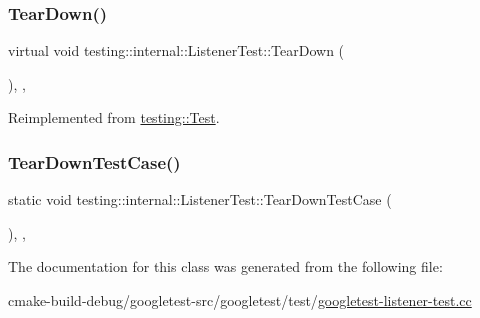 \subsubsection{\texorpdfstring{TearDown()}{TearDown()}}
{\footnotesize\ttfamily virtual void testing\+::internal\+::\+Listener\+Test\+::\+Tear\+Down (\begin{DoxyParamCaption}{ }\end{DoxyParamCaption})\hspace{0.3cm}{\ttfamily [inline]}, {\ttfamily [protected]}, {\ttfamily [virtual]}}



Reimplemented from \mbox{\hyperlink{classtesting_1_1Test_a5f0ab439802cbe0ef7552f1a9f791923}{testing\+::\+Test}}.

\mbox{\label{classtesting_1_1internal_1_1ListenerTest_aa35b5f1c6235f0fe98aa2c7f35bb8fe1}} 
\subsubsection{\texorpdfstring{TearDownTestCase()}{TearDownTestCase()}}
{\footnotesize\ttfamily static void testing\+::internal\+::\+Listener\+Test\+::\+Tear\+Down\+Test\+Case (\begin{DoxyParamCaption}{ }\end{DoxyParamCaption})\hspace{0.3cm}{\ttfamily [inline]}, {\ttfamily [static]}, {\ttfamily [protected]}}



The documentation for this class was generated from the following file\+:\begin{DoxyCompactItemize}
\item 
cmake-\/build-\/debug/googletest-\/src/googletest/test/\mbox{\hyperlink{googletest-listener-test_8cc}{googletest-\/listener-\/test.\+cc}}\end{DoxyCompactItemize}
